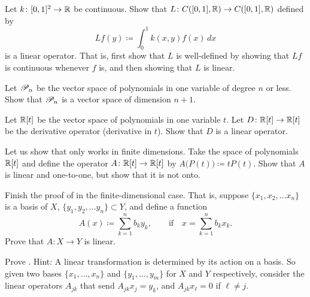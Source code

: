 \begin{exercise} \label{exercise:continuouskernel}
Let $k \colon [0,1]^2 \to {\mathbb{R}}$ be continuous.  Show that
$L \colon C([0,1],{\mathbb{R}}) \to C([0,1],{\mathbb{R}})$ defined by
\begin{equation*}
Lf(y) \coloneqq \int_0^1 k(x,y)f(x)\,dx
\end{equation*}
is a linear operator.  That is, first show that $L$ is well-defined by
showing that $Lf$ is continuous whenever $f$ is, and
then showing that $L$ is linear.
\end{exercise}

\begin{exercise}
Let ${\mathscr{P}}_n$ be the vector space of polynomials in one variable of degree $n$
or less.  Show that ${\mathscr{P}}_n$ is a vector space of dimension $n+1$.
\end{exercise}

\begin{exercise}
Let ${\mathbb{R}}[t]$ be the vector space of polynomials in one variable $t$.  Let
$D \colon {\mathbb{R}}[t] \to {\mathbb{R}}[t]$ be the derivative operator (derivative in $t$).
Show that $D$ is a linear operator.
\end{exercise}

\begin{exercise}
Let us show that  only works in finite
dimensions.  Take the space of polynomials ${\mathbb{R}}[t]$ and define the operator $A \colon {\mathbb{R}}[t] \to {\mathbb{R}}[t]$
by $A\bigl(P(t)\bigr) \coloneqq tP(t)$.  Show that $A$ is linear and one-to-one, but
show that it is not onto.
\end{exercise}

\begin{exercise}
Finish the proof of  in the finite-dimensional case.
That is, suppose
$\{ x_1, x_2,\ldots x_n \}$ is a basis of $X$,
$\{ y_1, y_2,\ldots y_n \} \subset Y$, and define a
function
\begin{equation*}
A(x) \coloneqq \sum_{k=1}^n b_k y_k, \qquad \text{if} \quad x=\sum_{k=1}^n b_k x_k .
\end{equation*}
Prove that $A \colon X \to Y$ is linear.
\end{exercise}


\begin{exercise}
Prove .  Hint: A linear transformation is determined by
its action on a basis.  So given two bases
$\{ x_1,\ldots,x_n \}$ and
$\{ y_1,\ldots,y_m \}$ for $X$ and $Y$ respectively, consider the linear
operators $A_{jk}$ that send $A_{jk} x_j = y_k$, and 
$A_{jk} x_\ell = 0$ if $\ell \not= j$.
\end{exercise}

